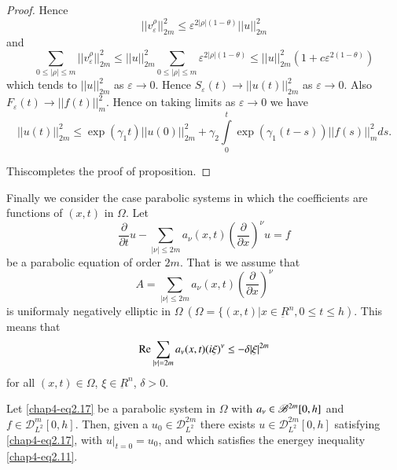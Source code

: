 \begin{proof}
Hence 
$$
|| v^\rho_{\varepsilon} ||^2_{2m} \leq \varepsilon^{2|\rho| (1 - \theta )} || u 
||^2_{2m} 
$$
and  
$$
\sum_{0\leq|\rho|\leq m} || v^\rho_\varepsilon||^2_{2m} \leq || u
||^2_{2m} \sum_{0\leq|\rho|\leq m} \varepsilon^{2 |\rho| (1 -
  \theta)}  \leq || u ||^2_{2m} (1 + c \varepsilon^{2 (1 - \theta)}) 
$$
which tends to $|| u ||^2_{2m}$ as $ \varepsilon \to 0$. Hence
$S_\varepsilon(t) \to || u (t)||^2_{2m}$ as $\varepsilon \to 0$. Also
$F_{\varepsilon}(t) \to || f(t) ||^2_m$. Hence on taking limits as
$\varepsilon \to 0$ 
we have  
$$
|| u(t) ||^2_{2m} \leq \exp (\gamma_1 t) || u (0) ||^2_{2m} + \gamma_2
\int\limits^t_0 \exp (\gamma_1 (t- s)) || f (s) ||^2_m ds.  
$$

This\pageoriginale completes the proof of proposition.
\end{proof}

Finally we consider the case parabolic systems in which the
coefficients are functions of $(x, t)$ in $\Omega$. Let  
\begin{equation*}
\frac{\partial}{\partial t} u - \sum_{|\nu |\leq 2 m} a_\nu (x, t)
(\frac{\partial}{\partial x})^\nu u = f \tag{2.17}\label{chap4-eq2.17} 
\end{equation*}
be a parabolic equation of order $2m$. That is we assume that 
$$
A = \sum_{|\nu|\leq 2m} a_\nu (x, t) (\frac{\partial }{\partial
  x})^\nu  
$$
is uniformaly negatively elliptic in $\Omega\ (\Omega = \{ (x, t)| x
\in \underbar{R}^n , 0 \leq t \leq h)$. This means that  
$$
\operatorname{Re} \sum_{|\nu|=2m} a_\nu (x, t) (i \xi)^\nu \leq - \delta |\xi|^{2m}  
$$
for all $(x, t) \in \Omega$, $\xi \in \underbar{R}^n$,
$\delta > 0$.  

\begin{proposition}\label{chap4-sec2-prop3} %
Let \eqref{chap4-eq2.17} be a parabolic system in $\Omega$ with $a_\nu
\in\mathscr{B}^{2m}\break [0, h]$ and $f \in
\mathscr{D}^{m}_{L^2} [0, h]$. Then, given a $u_0 \in  
\mathscr{D}^{2m}_{L^2}$  there exists $u \in
\mathscr{D}^{2m}_{L^2} [0, h]$ satisfying \eqref{chap4-eq2.17}, with
$u \Big|_{t=0} 
=u_0$, and which satisfies the energey inequality \eqref{chap4-eq2.11}. 
\end{proposition}


